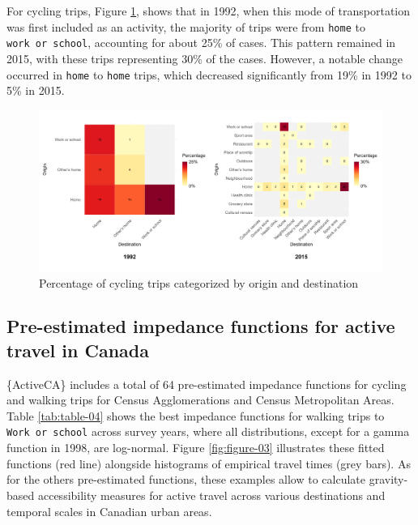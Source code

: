 \documentclass[Royal,times,sageh]{sagej}
\begin{document}
For cycling trips, Figure \ref{fig:figure-02}, shows that in 1992, when
this mode of transportation was first included as an activity, the
majority of trips were from \texttt{home} to \texttt{work\ or\ school},
accounting for about 25\% of cases. This pattern remained in 2015, with
these trips representing 30\% of the cases. However, a notable change
occurred in \texttt{home} to \texttt{home} trips, which decreased
significantly from 19\% in 1992 to 5\% in 2015.

\begin{figure}

{\centering \includegraphics[width=1\linewidth]{Manuscript-figures/cycling_hm_fig} 

}

\caption{Percentage of cycling trips categorized by origin and destination}\label{fig:figure-02}
\end{figure}

\subsection{Pre-estimated impedance functions for active travel in
Canada}\label{pre-estimated-impedance-functions-for-active-travel-in-canada}

\{ActiveCA\} includes a total of 64 pre-estimated impedance functions
for cycling and walking trips for Census Agglomerations and Census
Metropolitan Areas. Table \ref{tab:table-04} shows the best impedance
functions for walking trips to \texttt{Work\ or\ school} across survey
years, where all distributions, except for a gamma function in 1998, are
log-normal. Figure \ref{fig:figure-03} illustrates these fitted
functions (red line) alongside histograms of empirical travel times
(grey bars). As for the others pre-estimated functions, these examples
allow to calculate gravity-based accessibility measures for active
travel across various destinations and temporal scales in Canadian urban
areas.
\end{document}
